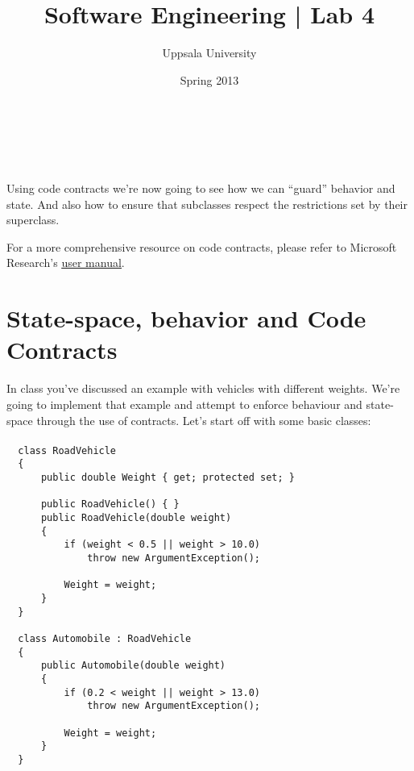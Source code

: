 \documentclass{article}
\begin{document}
  \title{ Software Engineering | Lab 4 }
  \author{ Uppsala University }
  \date{ Spring 2013 }
  \maketitle


   

  \section*{}
    Using code contracts we're now going to see how we can ``guard'' behavior and state. And also how to ensure that subclasses respect the restrictions set by their superclass.

    For a more comprehensive resource on code contracts, please refer to Microsoft Research's \href{http://research.microsoft.com/en-us/projects/contracts/userdoc.pdf}{\underline{user manual}}.

\section{State-space, behavior and Code Contracts}
  In class you've discussed an example with vehicles with different weights. We're going to implement that example and attempt to enforce behaviour and state-space through the use of contracts. Let's start off with some basic classes:

  \paragraph{}
    \begin{lstlisting}
  class RoadVehicle
  {
      public double Weight { get; protected set; }

      public RoadVehicle() { }
      public RoadVehicle(double weight)
      {
          if (weight < 0.5 || weight > 10.0)
              throw new ArgumentException();

          Weight = weight;
      }
  }

  class Automobile : RoadVehicle
  {
      public Automobile(double weight)
      {
          if (0.2 < weight || weight > 13.0)
              throw new ArgumentException();
          
          Weight = weight;
      }
  }
    \end{lstlisting}
\end{document}
